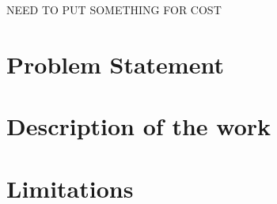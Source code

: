 NEED TO PUT SOMETHING FOR COST

\section{Problem Statement}



\section{Description of the work}

\section{Limitations}



%
%
%
%
%
%
%
